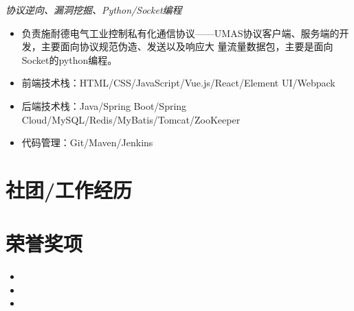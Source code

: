 \documentclass{uniquecv}
\begin{document}
{\it }
\quad \emph{协议逆向、漏洞挖掘、Python/Socket编程}
\vspace{0.4ex}

\begin{itemize}
  \item 负责施耐德电气工业控制私有化通信协议——UMAS协议客户端、服务端的开发，主要面向协议规范伪造、发送以及响应大
量流量数据包，主要是面向Socket的python编程。
\end{itemize}

{\it }
\vspace{0.4ex}

\begin{itemize}
  \item 前端技术栈：HTML/CSS/JavaScript/Vue.js/React/Element UI/Webpack
  \item 后端技术栈：Java/Spring Boot/Spring Cloud/MySQL/Redis/MyBatis/Tomcat/ZooKeeper
  \item 代码管理：Git/Maven/Jenkins
\end{itemize}


\section{社团/工作经历}

\section{荣誉奖项}


{\it}
\vspace{0.4ex}

\begin{itemize}
  \item {}
  \item {}
  \item {}
\end{itemize}
\end{document}
